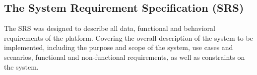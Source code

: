 

\subsection{The System Requirement Specification (SRS)}

The SRS was designed to describe all data, functional and behavioral requirements of the platform. Covering the overall description of the system to be implemented, including the purpose and scope of the system, use cases and scenarios, functional and non-functional requirements, as well as constraints on the system.

